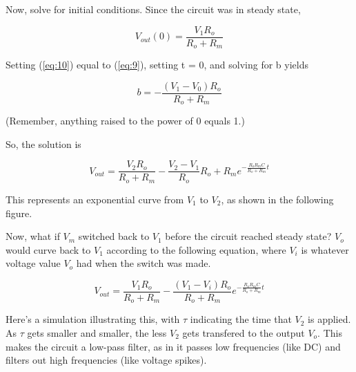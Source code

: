 \documentclass[12pt]{article}
\begin{document}
Now, solve for initial conditions. Since the circuit was in steady state,

\begin{equation} \label{eq:10}
V_{out}(0) = \frac{V_{1}R_{o}}{R_{o}+R_{m}}
\end{equation}

Setting (\ref{eq:10}) equal to (\ref{eq:9}), setting t = 0, and solving for b yields

\begin{equation} \label{eq:11}
b = -\frac{(V_{1} - V_{0})R_{o}}{R_{o} + R_{m}}
\end{equation}

(Remember, anything raised to the power of 0 equals 1.)

So, the solution is

\begin{equation} \label{eq:12}
V_{out} = \frac{V_{2}R_{o}}{R_{o}+R_{m}} - \frac{V_{2} - V_{1}}{R_{o}}{R_{o} + R_{m}}e^{-\frac{R_{o}R_{m}C}{R_{o} + R_{m}}t}
\end{equation}

This represents an exponential curve from $V_{1}$ to $V_{2}$, as shown in the following figure.

Now, what if $V_{m}$ switched back to $V_{1}$ before the circuit reached steady state? $V_{o}$ would curve back to $V_{1}$ according to the following equation, where $V_{i}$ is whatever voltage value $V_{o}$ had when the switch was made.

\begin{equation} \label{eq:13}
V_{out} = \frac{V_{1}R_{o}}{R_{o}+R_{m}} - \frac{(V_{1} - V_{i})R_{o}}{R_{o} + R_{m}}e^{-\frac{R_{o}R_{m}C}{R_{o} + R_{m}}t}
\end{equation}

Here's a simulation illustrating this, with $\tau$ indicating the time that $V_{2}$ is applied. As $\tau$ gets smaller and smaller, the less $V_{2}$ gets transfered to the output $V_{o}$. This makes the circuit a low-pass filter, as in it passes low frequencies (like DC) and filters out high frequencies (like voltage spikes).
\end{document}

